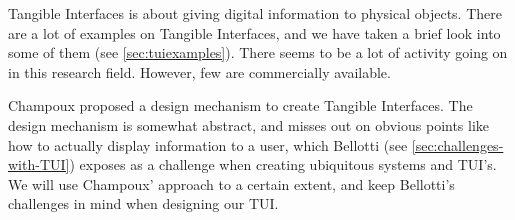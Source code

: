 Tangible Interfaces is about giving digital information to physical objects. There are a lot of examples on Tangible Interfaces, and we have taken a brief look into some of them (see \ref{sec:tuiexamples}). There seems to be a lot of activity going on in this research field. However, few are commercially available. 

Champoux proposed a design mechanism to create Tangible Interfaces. The design mechanism is somewhat abstract, and misses out on obvious points like how to actually display information to a user, which Bellotti \etal{} (see \ref{sec:challenges-with-TUI}) exposes as a challenge when creating ubiquitous systems and TUI's. We will use Champoux' approach to a certain extent, and keep Bellotti's challenges in mind when designing our TUI.   

 
